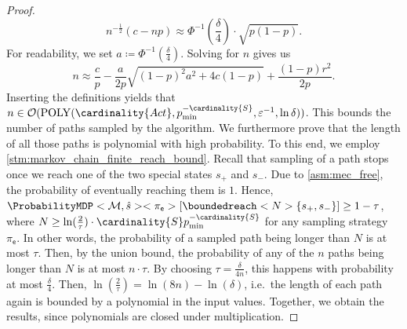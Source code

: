 \documentclass{article}
\newcommand{\MDP}{\mathcal{M}}
\newcommand{\States}{S}
\newcommand{\initialstate}{\hat{s}}
\newcommand{\Actions}{Act}
\newcommand{\strategy}{\pi}
\newcommand{\targetstate}{s_+}
\newcommand{\sinkstate}{s_-}
\newcommand{\algoepisode}{\mathsf{e}}
\begin{document}
\begin{proof}
\begin{equation*}
		n^{-\frac{1}{2}} (c - np) \approx \Phi^{-1}\left( \frac{\delta}{4} \right) \cdot \sqrt{p (1 - p)}.
	\end{equation*}
	For readability, we set $a \coloneqq \Phi^{-1}\left( \frac{\delta}{4} \right)$.
	Solving for $n$ gives us
	\begin{equation*}
		n \approx \frac{c}{p} - \frac{a}{2p} \sqrt{(1-p)^2 a^2 + 4 c (1 - p)} + \frac{(1 - p) r^2}{2p}.
	\end{equation*}
	Inserting the definitions yields that $n \in \mathcal{O}(\mathrm{POLY}(\cardinality{\Actions}, p_{\min}^{-\cardinality{\States}}, \varepsilon^{-1}, \ln \delta))$.
	This bounds the number of paths sampled by the algorithm.
	We furthermore prove that the length of all those paths is polynomial with high probability.
	To this end, we employ \cref{stm:markov_chain_finite_reach_bound}.
	Recall that sampling of a path stops once we reach one of the two special states $\targetstate$ and $\sinkstate$.
	Due to \cref{asm:mec_free}, the probability of eventually reaching them is $1$.
	Hence, $\ProbabilityMDP<\MDP, \initialstate><\strategy_\algoepisode>[\boundedreach<N> \{\targetstate, \sinkstate\}] \geq 1 - \tau$, where $N \geq \ln(\frac{2}{\tau}) \cdot \cardinality{\States} p_{\min}^{-\cardinality{\States}}$ for any sampling strategy $\strategy_\algoepisode$.
	In other words, the probability of a sampled path being longer than $N$ is at most $\tau$.
	Then, by the union bound, the probability of any of the $n$ paths being longer than $N$ is at most $n \cdot \tau$.
	By choosing $\tau = \frac{\delta}{4 n}$, this happens with probability at most $\frac{\delta}{4}$.
	Then, $\ln(\frac{2}{\tau}) = \ln(8 n) - \ln(\delta)$, i.e.\ the length of each path again is bounded by a polynomial in the input values.
	Together, we obtain the results, since polynomials are closed under multiplication. 
\end{proof}
\end{document}
